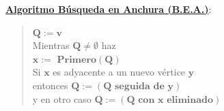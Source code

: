 \documentclass[twoside]{report}
\newcommand{\bs}[1]{\boldsymbol{#1}}
\begin{document}
\vspace{1cm}
\noindent\underline{\textbf{Algoritmo B\'{u}squeda en Anchura (B.E.A.)}}:

        \begin{quotation}
        \noindent $\bs{Q:=v}$\\[1ex]
        \textsf{Mientras} $\bs{Q\neq\emptyset}$ \textsf{haz}\\[1ex]
        \hspace*{5ex} $\bs{x:=\mbox{ Primero}(Q)}$\\[1ex]
        \hspace*{5ex} \textsf{Si} $\bs{x}$ es adyacente a un nuevo v\'{e}rtice $\bs{y}$\\[1ex]
        \hspace*{10ex} \textsf{entonces} $\bs{Q:=(Q\mbox{ seguida de }y)}$\\[1ex]
        \hspace*{10ex} \textsf{y en otro caso} $\bs{Q:=(Q\mbox{ con }x\mbox{ eliminado})}$
        \end{quotation}
\end{document}
